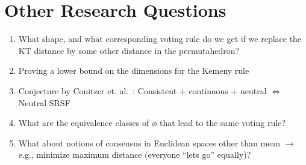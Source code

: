 \documentclass[10pt,letterpaper]{article}
\begin{document}

\section{Other Research Questions}
\begin{enumerate}
\item What shape, and what corresponding voting rule do we get if we replace the KT distance by some other distance in the permutahedron?
\item Proving a lower bound on the dimensions for the Kemeny rule
\item Conjecture by Conitzer et. al.~\cite{CRX09}: Consistent $+$ continuous $+$ neutral $\Leftrightarrow$ Neutral SRSF
\item What are the equivalence classes of $\phi$ that lead to the same voting rule?
\item What about notions of consensus in Euclidean spaces other than mean $\rightarrow$ e.g., minimize maximum distance (everyone ``lets go'' equally)?
\end{enumerate}



\begin{comment}
Mean proximity rule / generalized scoring rule / SRSF - Neutral $\Rightarrow$ SRSF iff MLE
{\bf Question:} (Linear) Mean Proximity Rules - Captures all ``pairwise comparison scoring rules''?
\end{comment}




\end{document}
